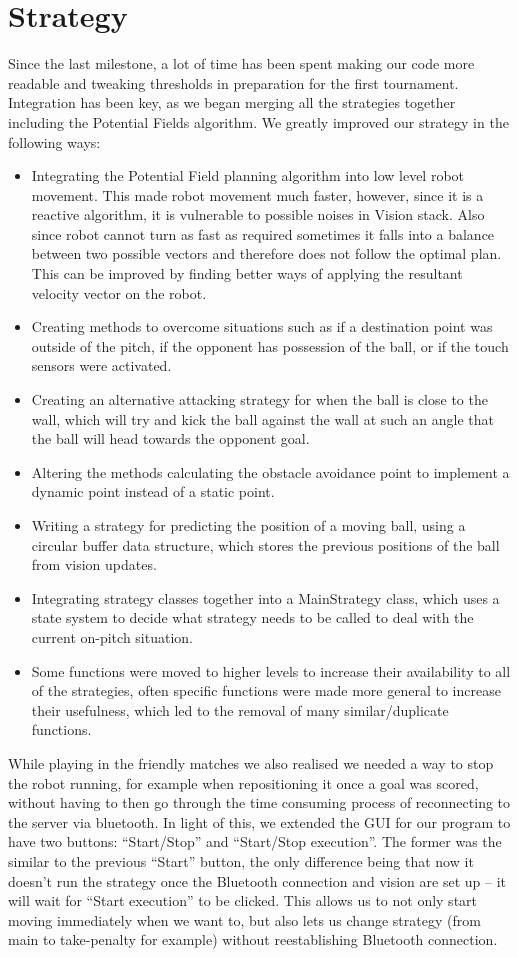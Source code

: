 \documentclass[conference,12pt]{IEEEtran}
\begin{document}
\section{Strategy}
Since the last milestone, a lot of time has been spent making our code more readable and tweaking thresholds in preparation for the first tournament. Integration has been key, as we  began merging all the strategies together including the Potential Fields algorithm. 
We greatly improved our strategy in the following ways:
\begin{itemize}
\item Integrating the Potential Field planning algorithm into low level robot movement. This made robot movement much faster, however, since it is a reactive algorithm, it is vulnerable to possible noises in Vision stack. Also since robot cannot turn as fast as required sometimes it falls into a balance between two possible vectors and therefore does not follow the optimal plan. This can be improved by finding better ways of applying the resultant velocity vector on the robot.
\item Creating methods to overcome situations such as if a destination point was outside of the pitch, if the opponent has possession of the ball, or if the touch sensors were activated.
\item Creating an alternative attacking strategy for when the ball is close to the wall, which will try and kick the ball against the wall at such an angle that the ball will head towards the  opponent goal.
\item Altering the methods calculating the obstacle avoidance point to implement a dynamic point instead of a static point.
\item Writing a strategy for predicting the position of a moving ball, using a circular buffer data structure, which stores the previous positions of the ball from vision updates.
\item Integrating strategy classes together into a MainStrategy class, which uses a state system to decide what strategy needs to be called to deal with the current on-pitch situation.
\item Some functions were moved to higher levels to increase their availability to all of the strategies, often specific functions were made more general to increase their usefulness, which led to the removal of many similar/duplicate functions.
\end{itemize}
While playing in the friendly matches we also realised we needed a way to stop the robot running, for example when repositioning it once a goal was scored, without having to then go through the time consuming process of reconnecting to the server via bluetooth. In light of this,         we extended the GUI for our program to have two buttons: “Start/Stop” and “Start/Stop execution”. The former was the similar to the previous “Start” button, the only difference being that now it doesn’t run the strategy once the Bluetooth connection and vision are set up – it will wait for “Start execution” to be clicked. This allows us to not only start moving immediately when we want to, but also lets us change strategy (from main to take-penalty for example) without reestablishing Bluetooth connection.
\end{document}
